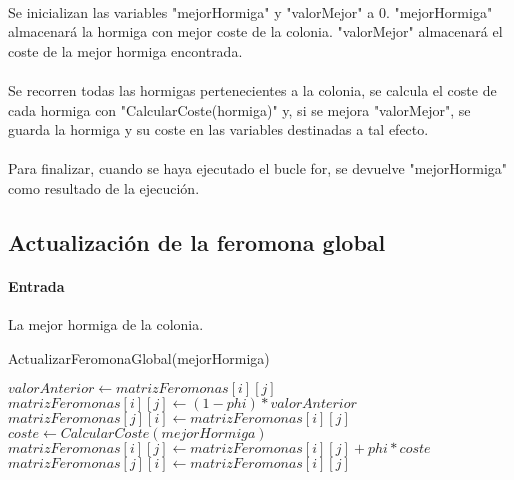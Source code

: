 	\paragraph{}Se inicializan las variables "mejorHormiga" y "valorMejor" a 0. "mejorHormiga" almacenará la hormiga con mejor coste de la colonia. "valorMejor" almacenará el coste de la mejor hormiga encontrada.
	
	\paragraph{}Se recorren todas las hormigas pertenecientes a la colonia, se calcula el coste de cada hormiga con "CalcularCoste(hormiga)" y, si se mejora "valorMejor", se guarda la hormiga y su coste en las variables destinadas a tal efecto.
	
	\paragraph{}Para finalizar, cuando se haya ejecutado el bucle for, se devuelve "mejorHormiga" como resultado de la ejecución.
	
	\newpage
	
	\subsection{Actualización de la feromona global}
	
	\paragraph{Entrada}La mejor hormiga de la colonia.
	
	\begin{algorithm}[H]
		\caption{ActualizarFeromonaGlobal(mejorHormiga)}
		\begin{algorithmic}
			\STATE$valorAnterior \leftarrow matrizFeromonas[i][j]$
			\STATE$matrizFeromonas[i][j] \leftarrow (1-phi)*valorAnterior$
			\STATE$matrizFeromonas[j][i] \leftarrow matrizFeromonas[i][j]$
			\ENDFOR
			\ENDFOR
			\STATE$coste \leftarrow CalcularCoste(mejorHormiga)$
			\STATE$matrizFeromonas[i][j]\leftarrow matrizFeromonas[i][j] + phi*coste$
			\STATE$matrizFeromonas[j][i] \leftarrow matrizFeromonas[i][j]$
			\ENDFOR
			\ENDFOR
		\end{algorithmic}
	\end{algorithm}

